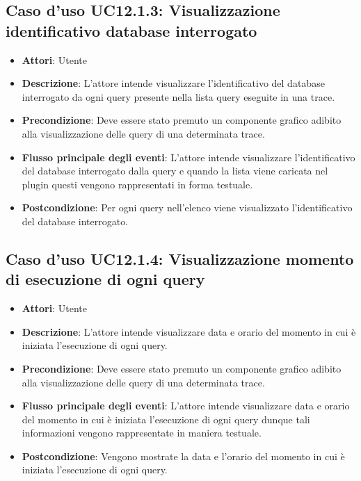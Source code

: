 \subsection{Caso d'uso UC12.1.3: Visualizzazione identificativo database interrogato}
\begin{itemize}
	\item \textbf{Attori}: Utente
	\item \textbf{Descrizione}: L'attore intende visualizzare l'identificativo del database interrogato da ogni query presente nella lista query eseguite in una trace.
	\item \textbf{Precondizione}: Deve essere stato premuto un componente grafico adibito alla visualizzazione delle query di una determinata trace.
	
	\item \textbf{Flusso principale degli eventi}: L'attore intende visualizzare l'identificativo del database interrogato dalla query e quando la lista viene caricata nel plugin questi vengono rappresentati in forma testuale.
	\item \textbf{Postcondizione}: Per ogni query nell'elenco viene visualizzato l'identificativo del database interrogato.
\end{itemize}
\subsection{Caso d'uso UC12.1.4: Visualizzazione momento di esecuzione di ogni query}
\begin{itemize}
	\item \textbf{Attori}: Utente
	\item \textbf{Descrizione}: L'attore intende visualizzare data e orario del momento in cui è iniziata l'esecuzione di ogni query.
	\item \textbf{Precondizione}: Deve essere stato premuto un componente grafico adibito alla visualizzazione delle query di una determinata trace.
	\item \textbf{Flusso principale degli eventi}: L'attore intende visualizzare data e orario del momento in cui è iniziata l'esecuzione di ogni query dunque tali informazioni vengono rappresentate in maniera testuale.
	\item \textbf{Postcondizione}: Vengono mostrate la data e l'orario del momento in cui è iniziata l'esecuzione di ogni query.
\end{itemize}

